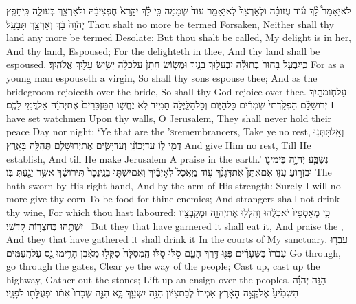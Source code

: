 {לֹא\maqqaf יֵאָמֵר֩ לָ֨ךְ ע֜וֹד עֲזוּבָ֗ה וּלְאַרְצֵךְ֙ לֹֽא\maqqaf יֵאָמֵ֥ר עוֹד֙ שְׁמָמָ֔ה כִּ֣י לָ֗ךְ יִקָּרֵא֙ חֶפְצִי\maqqaf בָ֔הּ וּלְאַרְצֵ֖ךְ בְּעוּלָ֑ה כִּֽי\maqqaf חָפֵ֤ץ יְהֹוָה֙ בָּ֔ךְ וְאַרְצֵ֖ךְ תִּבָּעֵֽל׃}
{Thou shalt no more be termed Forsaken, Neither shall thy land any more be termed Desolate; But thou shalt be called, My delight is in her, And thy land, Espoused; For the \lord\space delighteth in thee, And thy land shall be espoused.}
{כִּֽי\maqqaf יִבְעַ֤ל בָּחוּר֙ בְּתוּלָ֔ה יִבְעָל֖וּךְ בָּנָ֑יִךְ וּמְשׂ֤וֹשׂ חָתָן֙ עַל\maqqaf כַּלָּ֔ה יָשִׂ֥ישׂ עָלַ֖יִךְ אֱלֹהָֽיִךְ׃}
{For as a young man espouseth a virgin, So shall thy sons espouse thee; And as the bridegroom rejoiceth over the bride, So shall thy God rejoice over thee.}
{עַל\maqqaf חֽוֹמֹתַ֣יִךְ יְרוּשָׁלַ֗͏ִם הִפְקַ֙דְתִּי֙ שֹֽׁמְרִ֔ים כׇּל\maqqaf הַיּ֧וֹם וְכׇל\maqqaf הַלַּ֛יְלָה תָּמִ֖יד לֹ֣א יֶחֱשׁ֑וּ הַמַּזְכִּרִים֙ אֶת\maqqaf יְהֹוָ֔ה אַל\maqqaf דֳּמִ֖י לָכֶֽם׃}
{I have set watchmen Upon thy walls, O Jerusalem, They shall never hold their peace Day nor night: ‘Ye that are the \lord\textsc{’s}\space remembrancers, Take ye no rest,}
{וְאַֽל\maqqaf תִּתְּנ֥וּ דֳמִ֖י ל֑וֹ עַד\maqqaf יְכוֹנֵ֞ן וְעַד\maqqaf יָשִׂ֧ים אֶת\maqqaf יְרוּשָׁלַ֛͏ִם תְּהִלָּ֖ה בָּאָֽרֶץ׃}
{And give Him no rest, Till He establish, And till He make Jerusalem A praise in the earth.’}
{נִשְׁבַּ֧ע יְהֹוָ֛ה בִּימִינ֖וֹ וּבִזְר֣וֹעַ עֻזּ֑וֹ אִם\maqqaf אֶתֵּן֩ אֶת\maqqaf דְּגָנֵ֨ךְ ע֤וֹד מַֽאֲכָל֙ לְאֹ֣יְבַ֔יִךְ וְאִם\maqqaf יִשְׁתּ֤וּ בְנֵֽי\maqqaf נֵכָר֙ תִּֽירוֹשֵׁ֔ךְ אֲשֶׁ֥ר יָגַ֖עַתְּ בּֽוֹ׃}
{The \lord\space hath sworn by His right hand, And by the arm of His strength: Surely I will no more give thy corn To be food for thine enemies; And strangers shall not drink thy wine, For which thou hast laboured;}
{כִּ֤י מְאַסְפָיו֙ יֹאכְלֻ֔הוּ וְהִֽלְל֖וּ אֶת\maqqaf יְהֹוָ֑ה וּמְקַבְּצָ֥יו יִשְׁתֻּ֖הוּ בְּחַצְר֥וֹת קׇדְשִֽׁי׃ \setuma }
{But they that have garnered it shall eat it, And praise the \lord, And they that have gathered it shall drink it In the courts of My sanctuary.}
{עִבְר֤וּ עִבְרוּ֙ בַּשְּׁעָרִ֔ים פַּנּ֖וּ דֶּ֣רֶךְ הָעָ֑ם סֹ֣לּוּ סֹ֤לּוּ הַֽמְסִלָּה֙ סַקְּל֣וּ מֵאֶ֔בֶן הָרִ֥ימוּ נֵ֖ס עַל\maqqaf הָֽעַמִּֽים׃}
{Go through, go through the gates, Clear ye the way of the people; Cast up, cast up the highway, Gather out the stones; Lift up an ensign over the peoples.}
{הִנֵּ֣ה יְהֹוָ֗ה הִשְׁמִ֙יעַ֙ אֶל\maqqaf קְצֵ֣ה הָאָ֔רֶץ אִמְרוּ֙ לְבַת\maqqaf צִיּ֔וֹן הִנֵּ֥ה יִשְׁעֵ֖ךְ בָּ֑א הִנֵּ֤ה שְׂכָרוֹ֙ אִתּ֔וֹ וּפְעֻלָּת֖וֹ לְפָנָֽיו׃}
